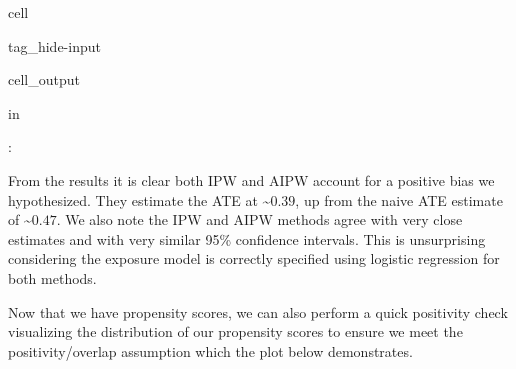 \documentclass[letterpaper,10pt,english]{jupyterBook}
\begin{document}
\begin{sphinxuseclass}{cell}
\begin{sphinxuseclass}{tag_hide-input}
\begin{sphinxVerbatimOutput}
\begin{sphinxuseclass}{cell_output}
\begin{sphinxVerbatim}[commandchars=\\\{\}]
 in 
     
       
       

: 
\end{sphinxVerbatim}

\end{sphinxuseclass}\end{sphinxVerbatimOutput}

\end{sphinxuseclass}
\end{sphinxuseclass}
\sphinxAtStartPar
From the results it is clear both IPW and AIPW account for a positive bias we hypothesized. They estimate the ATE at \textasciitilde{}\(0.39\), up from the naive ATE estimate of \textasciitilde{}\(0.47\). We also note the IPW and AIPW methods agree with very close estimates and with very similar 95\% confidence intervals. This is unsurprising considering the exposure model is correctly specified using logistic regression for both methods.

\sphinxAtStartPar
Now that we have propensity scores, we can also perform a quick positivity check visualizing the distribution of our propensity scores to ensure we meet the positivity/overlap assumption which the plot below demonstrates.
\end{document}
